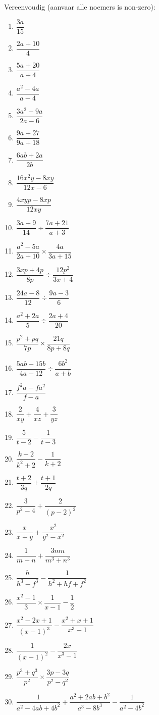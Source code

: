 \begin{exercises}{}
{

Vereenvoudig (aanvaar alle noemers is non-zero):
\begin{multicols}{2}
\begin{enumerate}[itemsep=5pt, label=\textbf{\arabic*}. ] 
\item$\dfrac{3a}{15}$
\item $\dfrac{2a+10}{4}$
\item $\dfrac{5a+20}{a+4}$
\item $\dfrac{{a}^{2}-4a}{a-4}$
\item $\dfrac{3{a}^{2}-9a}{2a-6}$
\item $\dfrac{9a+27}{9a+18}$
\item $\dfrac{6ab+2a}{2b}$
\item $\dfrac{16{x}^{2}y-8xy}{12x-6}$
\item $\dfrac{4xyp-8xp}{12xy}$
\item $\dfrac{3a+9}{14}÷\dfrac{7a+21}{a+3}$
\item $\dfrac{{a}^{2}-5a}{2a+10} \times \dfrac{4a}{3a+15}$
\item $\dfrac{3xp+4p}{8p}÷\dfrac{12{p}^{2}}{3x+4}$
\item $\dfrac{24a-8}{12}÷\dfrac{9a-3}{6}$
\item $\dfrac{{a}^{2}+2a}{5}÷\dfrac{2a+4}{20}$
\item $\dfrac{{p}^{2}+pq}{7p} \times \dfrac{21q}{8p+8q}$
\item $\dfrac{5ab-15b}{4a-12}÷\dfrac{6{b}^{2}}{a+b}$
\item $\dfrac{{f}^{2}a-f{a}^{2}}{f-a}$
\item $\dfrac{2}{xy} + \dfrac{4}{xz}+\dfrac{3}{yz}$
\item $\dfrac{5}{t-2} - \dfrac{1}{t-3}$
\item $\dfrac{k+2}{k^{2} +2} - \dfrac{1}{k+2}$
\item $\dfrac{t+2}{3q} + \dfrac{t+1}{2q}$
\item $\dfrac{3}{p^{2}-4}+\dfrac{2}{(p-2)^{2}}$
\item $\dfrac{x}{x+y}+\dfrac{x^{2}}{y^{2} - x^{2}}$
\item $\dfrac{1}{m+n} + \dfrac{3mn}{m^{3} + n^{3}}$
\item $\dfrac{h}{h^{3}-f^{3}} - \dfrac{1}{h^{2} + hf + f^{2}}$
\item $\dfrac{{x}^{2}-1}{3}\times\dfrac{1}{x-1}-\dfrac{1}{2}$
\item $\dfrac{x^2-2x+1}{(x-1)^3} - \dfrac{x^2+x+1}{x^3-1}$
\item $\dfrac{1}{(x-1)^2} - \dfrac{2x}{x^3-1}$
\item $\dfrac{p^3 + q^3}{p^2} \times \dfrac{3p-3q}{p^2-q^2}$
\item $\dfrac{1}{a^2-4ab+4b^2} + \dfrac{a^2+2ab+b^2}{a^3-8b^3} - \dfrac{1}{a^2-4b^2}$
\end{enumerate}
\end{multicols}

}
\end{exercises}

